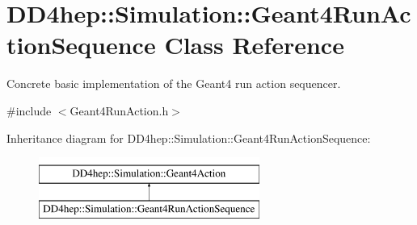 \hypertarget{class_d_d4hep_1_1_simulation_1_1_geant4_run_action_sequence}{}\section{D\+D4hep\+:\+:Simulation\+:\+:Geant4\+Run\+Action\+Sequence Class Reference}
\label{class_d_d4hep_1_1_simulation_1_1_geant4_run_action_sequence}


Concrete basic implementation of the Geant4 run action sequencer.  




{\ttfamily \#include $<$Geant4\+Run\+Action.\+h$>$}

Inheritance diagram for D\+D4hep\+:\+:Simulation\+:\+:Geant4\+Run\+Action\+Sequence\+:\begin{figure}[H]
\begin{center}
\leavevmode
\includegraphics[height=2.000000cm]{class_d_d4hep_1_1_simulation_1_1_geant4_run_action_sequence}
\end{center}
\end{figure}

